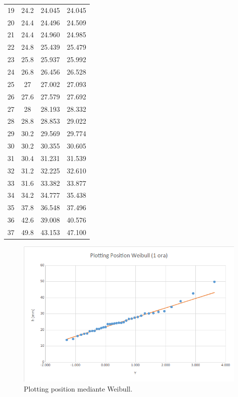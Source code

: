\begin{table}[H]
\begin{tabular}{cccc}
    19        & 24.2             & 24.045         & 24.045         \\
    20        & 24.4             & 24.496         & 24.509         \\
    21        & 24.4             & 24.960         & 24.985         \\
    22        & 24.8             & 25.439         & 25.479         \\
    23        & 25.8             & 25.937         & 25.992         \\
    24        & 26.8             & 26.456         & 26.528         \\
    25        & 27               & 27.002         & 27.093         \\
    26        & 27.6             & 27.579         & 27.692         \\
    27        & 28               & 28.193         & 28.332         \\
    28        & 28.8             & 28.853         & 29.022         \\
    29        & 30.2             & 29.569         & 29.774         \\
    30        & 30.2             & 30.355         & 30.605         \\
    31        & 30.4             & 31.231         & 31.539         \\
    32        & 31.2             & 32.225         & 32.610         \\
    33        & 31.6             & 33.382         & 33.877         \\
    34        & 34.2             & 34.777         & 35.438         \\
    35        & 37.8             & 36.548         & 37.496         \\
    36        & 42.6             & 39.008         & 40.576         \\
    37        & 49.8             & 43.153         & 47.100        
    \end{tabular}
    \end{table}

\begin{figure}[H]\centering
        \includegraphics[scale=.5]{immagini/plot_pos_weib_1ora.png}
        \caption{Plotting position mediante Weibull.}
      \label{plot_pos_weib_1ora}
 \end{figure}

